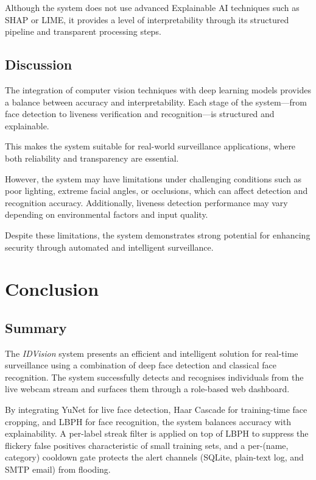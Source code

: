 \documentclass[11pt]{report}
\begin{document}
Although the system does not use advanced Explainable AI techniques such as SHAP or LIME, it provides a level of interpretability through its structured pipeline and transparent processing steps.
\section*{Discussion}

The integration of computer vision techniques with deep learning models provides a balance between accuracy and interpretability. Each stage of the system—from face detection to liveness verification and recognition—is structured and explainable.

This makes the system suitable for real-world surveillance applications, where both reliability and transparency are essential.

However, the system may have limitations under challenging conditions such as poor lighting, extreme facial angles, or occlusions, which can affect detection and recognition accuracy. Additionally, liveness detection performance may vary depending on environmental factors and input quality.

Despite these limitations, the system demonstrates strong potential for enhancing security through automated and intelligent surveillance.


\chapter{Conclusion}

\section{Summary}

The \textit{IDVision} system presents an efficient and intelligent solution for real-time surveillance using a combination of deep face detection and classical face recognition. The system successfully detects and recognises individuals from the live webcam stream and surfaces them through a role-based web dashboard.

By integrating YuNet for live face detection, Haar Cascade for training-time face cropping, and LBPH for face recognition, the system balances accuracy with explainability. A per-label streak filter is applied on top of LBPH to suppress the flickery false positives characteristic of small training sets, and a per-(name, category) cooldown gate protects the alert channels (SQLite, plain-text log, and SMTP email) from flooding.
\end{document}
